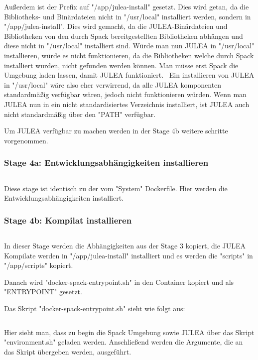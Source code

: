 Außerdem ist der Prefix auf "/app/julea-install" gesetzt. Dies wird getan, da die Bibliotheks- und Binärdateien nicht in "/usr/local" installiert werden, sondern in "/app/julea-install". Dies wird gemacht, da die JULEA-Binärdateien und Bibliotheken von den durch Spack bereitgestellten Bibliotheken abhängen und diese nicht in "/usr/local" installiert sind. Würde man nun JULEA in "/usr/local" installieren, würde es nicht funktionieren, da die Bibliotheken welche durch Spack installiert wurden, nicht gefunden werden können. Man müsse erst Spack die Umgebung laden lassen, damit JULEA funktioniert. \
Ein installieren von JULEA in "/usr/local" wäre also eher verwirrend, da alle JULEA komponenten standardmäßig verfügbar wären, jedoch nicht funktionieren würden. Wenn man JULEA nun in ein nicht standardisiertes Verzeichnis installiert, ist JULEA auch nicht standardmäßig über den "PATH" verfügbar. 

Um JULEA verfügbar zu machen werden in der Stage 4b weitere schritte vorgenommen.

\subsubsection{Stage 4a: Entwicklungsabhängigkeiten installieren}

\inputminted[firstline=51,lastline=55]{dockerfile}{./code-examples/Dockerfile.spack}

Diese stage ist identisch zu der vom "System" Dockerfile. Hier werden die Entwicklungsabhängigkeiten installiert.


\subsubsection{Stage 4b: Kompilat installieren}

\inputminted[firstline=42,lastline=48]{dockerfile}{./code-examples/Dockerfile.spack}

In dieser Stage werden die Abhängigkeiten aus der Stage 3 kopiert, die JULEA Kompilate werden in "/app/julea-install" installiert und es werden die "scripts" in "/app/scripts" kopiert.

Danach wird "docker-spack-entrypoint.sh" in den Container kopiert und als "ENTRYPOINT" gesetzt. 


Das Skript "docker-spack-entrypoint.sh" sieht wie folgt aus:
\inputminted{bash}{./code-examples/docker-spack-entrypoint.sh}

Hier sieht man, dass zu begin die Spack Umgebung sowie JULEA über das Skript "environment.sh" geladen werden.
Anschließend werden die Argumente, die an das Skript übergeben werden, ausgeführt.

